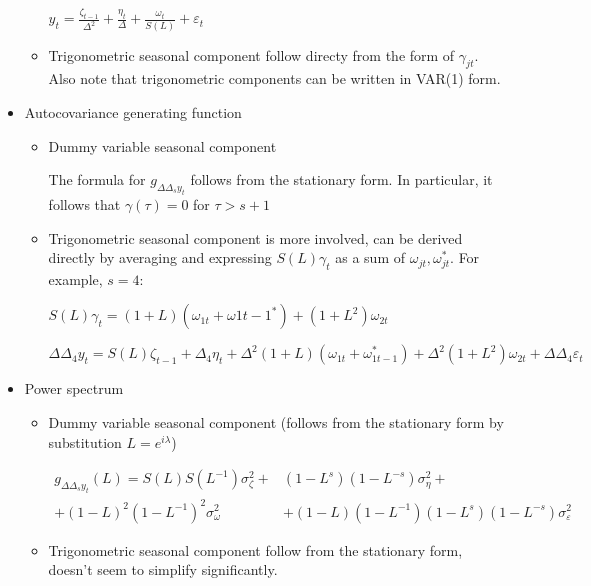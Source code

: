 \documentclass[12pt]{article}
\theoremstyle{definition}
\theoremstyle{remark}
\numberwithin{equation}{section}
\begin{document}
\begin{itemize}
\begin{itemize}
		$\displaystyle y_t = \frac {\zeta_{t-1}} {\Delta^2} + \frac {\eta_t} \Delta + \frac {\omega_t} {S(L)} + \varepsilon_t$

		\item Trigonometric seasonal component follow directy from the form of $\gamma_{jt}$. Also note that trigonometric components can be written in VAR(1) form.

	\end{itemize}

	\item Autocovariance generating function

	\begin{itemize}
		\item Dummy variable seasonal component

		The formula for $g_{\Delta\Delta_s y_t}$ follows from the stationary form. In particular, it follows that $\gamma(\tau) = 0$ for $\tau > s+1$

		\item Trigonometric seasonal component is more involved, can be derived directly by averaging and expressing $S(L)\gamma_t$ as a sum of $\omega_{jt}, \omega_{jt}^*$. For example, $s=4$:

		$S(L)\gamma_t = (1+L)(\omega_{1t}+\omega{1t-1}^*)+ (1+L^2)\omega_{2t}$

		$\Delta\Delta_4 y_t= S(L)\zeta_{t-1}+\Delta_4\eta_t +\Delta^2(1+L)(\omega_{1t}+\omega_{1t-1}^*) + \Delta^2(1+L^2)\omega_{2t}+\Delta\Delta_4\varepsilon_t$


	\end{itemize}

	\item Power spectrum

	\begin{itemize}
		\item Dummy variable seasonal component (follows from the stationary form by substitution $L = e^{i\lambda}$)

		\begin{align*}
			g_{\Delta\Delta_s y_t}(L) = S(L)S(L^{-1})\sigma^2_\zeta+ & (1-L^s)(1-L^{-s})\sigma^2_\eta+\\+(1-L)^2(1-L^{-1})^2\sigma^2_\omega & + (1-L)(1-L^{-1})(1-L^s)(1-L^{-s})\sigma^2_\varepsilon
		\end{align*}

		\item Trigonometric seasonal component follow from the stationary form, doesn't seem to simplify significantly.

	\end{itemize}
\end{itemize}
\end{document}
